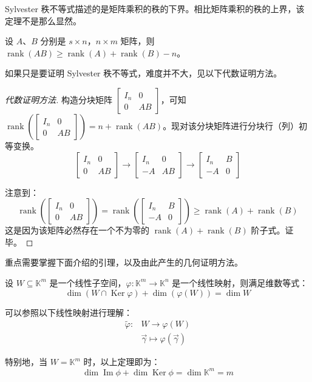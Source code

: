 Sylvester 秩不等式描述的是矩阵乘积的秩的下界。相比矩阵乘积的秩的上界，该定理不是那么显然。

\begin{theorem}
	设 $A$、$B$ 分别是 $s \times n$，$n \times m$ 矩阵，则 $\operatorname{rank}(AB) \ge \operatorname{rank}(A) + \operatorname{rank}(B) - n$。
\end{theorem}

如果只是要证明 Sylvester 秩不等式，难度并不大，见以下代数证明方法。

\begin{proof}[代数证明方法]
	构造分块矩阵 $\begin{bmatrix} I_n & 0 \\ 0 & AB \end{bmatrix}$，可知 $\operatorname{rank}\left(\begin{bmatrix} I_n & 0 \\ 0 & AB \end{bmatrix}\right) = n + \operatorname{rank}(AB)$。现对该分块矩阵进行分块行（列）初等变换。
	$$
	\begin{bmatrix} I_n & 0 \\ 0 & AB \end{bmatrix} \to
	\begin{bmatrix} I_n & 0 \\ -A & AB \end{bmatrix} \to
	\begin{bmatrix} I_n & B \\ -A & 0 \end{bmatrix}
	$$

	注意到：
	$$
	\operatorname{rank}\left(\begin{bmatrix} I_n & 0 \\ 0 & AB \end{bmatrix}\right) = \operatorname{rank}\left(\begin{bmatrix} I_n & B \\ -A & 0 \end{bmatrix}\right) \ge \operatorname{rank}(A) + \operatorname{rank}(B)
	$$
	这是因为该矩阵必然存在一个不为零的 $\operatorname{rank}(A) + \operatorname{rank}(B)$ 阶子式。证毕。
\end{proof}

\bigskip

重点需要掌握下面介绍的引理，以及由此产生的几何证明方法。


\begin{theorem}
	设 $W \subseteq \mathbb K^m$ 是一个线性子空间，$\varphi \colon \mathbb K^m \to \mathbb K^n$ 是一个线性映射，则满足维数等式：
	$$
	\dim (W \cap \operatorname{Ker} \varphi) + \dim (\varphi(W)) = \dim W
	$$
\end{theorem}

可以参照以下线性映射进行理解：
$$
\begin{aligned} \tilde \varphi \colon & W \to \varphi(W) \\ & \vec \gamma \mapsto \varphi(\vec \gamma) \end{aligned}
$$

特别地，当 $W = \mathbb K^m$ 时，以上定理即为：
$$
\dim \operatorname{Im} \phi + \dim \operatorname{Ker} \phi = \dim \mathbb K^m = m
$$